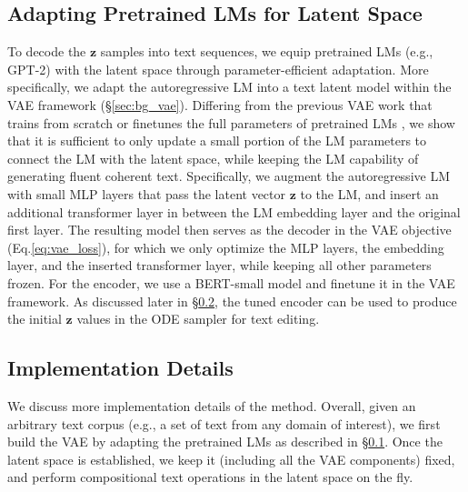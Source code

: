 \documentclass[11pt]{article}
\begin{document}
\subsection{Adapting Pretrained LMs for Latent Space}
\label{sec:vae_training}
To decode the $\bm{z}$ samples into text sequences, we equip pretrained LMs (e.g., GPT-2) with the latent space through parameter-efficient adaptation. More specifically, we adapt the autoregressive LM into a text latent model within the VAE framework (\S\ref{sec:bg_vae}). Differing from the previous VAE work that trains from scratch or finetunes the full parameters of pretrained LMs \citep{li-etal-2020-optimus,hu2021causal,hu2017toward}, we show that it is sufficient to only update a small portion of the LM parameters to connect the LM with the latent space, while keeping the LM capability of generating fluent coherent text. Specifically, we 
augment the autoregressive LM with small MLP layers that pass the latent vector $\bm{z}$ to the LM, and insert an additional transformer layer in between the LM embedding layer and the original first layer. The resulting model then serves as the decoder in the VAE objective (Eq.\ref{eq:vae_loss}), for which we only optimize the MLP layers, the embedding layer, and the inserted transformer layer, while keeping all other parameters frozen. For the encoder, we use a BERT-small model \cite{bert,DBLP:journals/corr/abs-1908-08962} and finetune it in the VAE framework. As discussed later in \S\ref{sec:implement}, the tuned encoder can be used to produce the initial $\bm z$ values in the ODE sampler for text editing.








\subsection{Implementation Details}\label{sec:implement}

We discuss more implementation details of the method. Overall, given an arbitrary text corpus (e.g., a set of text from any domain of interest), we first build the VAE by adapting the pretrained LMs as described in \S\ref{sec:vae_training}. Once the latent space is established, we keep it (including all the VAE components) fixed, and perform compositional text operations in the latent space on the fly.
\end{document}
